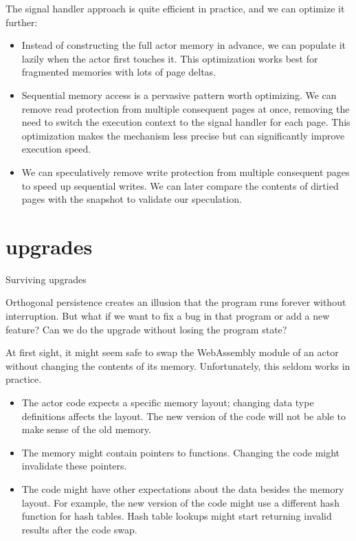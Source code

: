 \documentclass{article}
\begin{document}
The signal handler approach is quite efficient in practice, and we can optimize it further:
\begin{itemize}
  \item 
    Instead of constructing the full actor memory in advance, we can populate it lazily when the actor first touches it.
    This optimization works best for fragmented memories with lots of page deltas.
  \item 
    Sequential memory access is a pervasive pattern worth optimizing.
    We can remove read protection from multiple consequent pages at once, removing the need to switch the execution context to the signal handler for each page.
    This optimization makes the mechanism less precise but can significantly improve execution speed.
  \item 
    We can speculatively remove write protection from multiple consequent pages to speed up sequential writes.
    We can later compare the contents of dirtied pages with the snapshot to validate our speculation.
\end{itemize}

\section{upgrades}{Surviving upgrades}

Orthogonal persistence creates an illusion that the program runs forever without interruption.
But what if we want to fix a bug in that program or add a new feature?
Can we do the upgrade without losing the program state?

At first sight, it might seem safe to swap the WebAssembly module of an actor without changing the contents of its memory.
Unfortunately, this seldom works in practice.

\begin{itemize}
  \item 
    The actor code expects a specific memory layout; changing data type definitions affects the layout.
    The new version of the code will not be able to make sense of the old memory.
  \item 
    The memory might contain pointers to functions.
    Changing the code might invalidate these pointers.
  \item 
    The code might have other expectations about the data besides the memory layout.
    For example, the new version of the code might use a different hash function for hash tables.
    Hash table lookups might start returning invalid results after the code swap.
\end{itemize}
\end{document}
